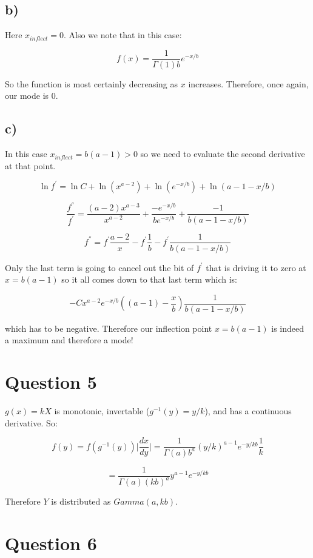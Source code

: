 \documentclass[11pt]{article}
\begin{document}
\subsection*{b)}

Here $x_{inflect}=0$. Also we note that in this case:

$$f(x) = \frac{1}{\Gamma(1)b}e^{-x/b}$$

So the function is most certainly decreasing as $x$ increases. Therefore, once again, our mode is $0$.

\subsection*{c)}

In this case $x_{inflect}=b(a-1)>0$ so we need to evaluate the second derivative at that point. 

$$\ln{f^{'}}=\ln{C} + \ln{(x^{a-2})} + \ln{(e^{-x/b})} + \ln{(a-1-x/b)}$$

$$\frac{f^{''}}{f^{'}}=\frac{(a-2)x^{a-3}}{x^{a-2}}+\frac{-e^{-x/b}}{be^{-x/b}}+\frac{-1}{b(a-1-x/b)}$$

$$f^{''} = f^{'}\frac{a-2}{x}-f^{'}\frac{1}{b}-f^{'}\frac{1}{b(a-1-x/b)}$$

Only the last term is going to cancel out the bit of $f^{'}$ that is driving it to zero at $x=b(a-1)$ so it all comes down to that last term which is:

$$-Cx^{a-2}e^{-x/b}\left( (a-1) - \frac{x}{b} \right)\frac{1}{b(a-1-x/b)}$$

which has to be negative. Therefore our inflection point $x=b(a-1)$ is indeed a maximum and therefore a mode!

\section*{Question 5}

$g(x)=k X$ is monotonic, invertable ($g^{-1}(y) = y/k$), and has a continuous derivative. So:

$$f(y) = f(g^{-1}(y))\Big| \frac{dx}{dy} \Big| =\frac{1}{\Gamma(a)b^a}(y/k)^{a-1}e^{-y/kb}\frac{1}{k} $$

$$=\frac{1}{\Gamma(a)(kb)^a}y^{a-1}e^{-y/kb}$$

Therefore $Y$ is distributed as $Gamma(a, kb)$.

\section*{Question 6}
\end{document}
